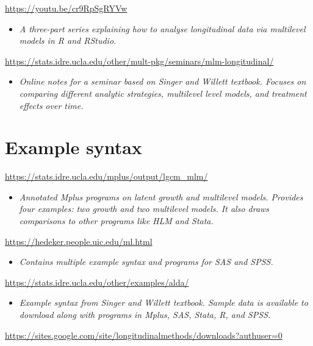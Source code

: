 \documentclass[
]{book}
\providecommand{\tightlist}{%
  \setlength{\itemsep}{0pt}\setlength{\parskip}{0pt}}
\begin{document}
\url{https://youtu.be/cr9RpSgRYVw}

\begin{itemize}
\tightlist
\item
  \emph{A three-part series explaining how to analyse longitudinal data via multilevel models in R and RStudio.}
\end{itemize}

\url{https://stats.idre.ucla.edu/other/mult-pkg/seminars/mlm-longitudinal/}

\begin{itemize}
\tightlist
\item
  \emph{Online notes for a seminar based on Singer and Willett textbook. Focuses on comparing different analytic strategies, multilevel level models, and treatment effects over time. }
\end{itemize}

\hypertarget{example-syntax}{%
\section{Example syntax}\label{example-syntax}}

\url{https://stats.idre.ucla.edu/mplus/output/lgcm_mlm/}

\begin{itemize}
\tightlist
\item
  \emph{Annotated Mplus programs on latent growth and multilevel models. Provides four examples: two growth and two multilevel models. It also draws comparisons to other programs like HLM and Stata. }
\end{itemize}

\url{https://hedeker.people.uic.edu/ml.html}

\begin{itemize}
\tightlist
\item
  \emph{Contains multiple example syntax and programs for SAS and SPSS.}
\end{itemize}

\url{https://stats.idre.ucla.edu/other/examples/alda/}

\begin{itemize}
\tightlist
\item
  \emph{Example syntax from Singer and Willett textbook. Sample data is available to download along with programs in Mplus, SAS, Stata, R, and SPSS. }
\end{itemize}

\url{https://sites.google.com/site/longitudinalmethods/downloads?authuser=0}
\end{document}

